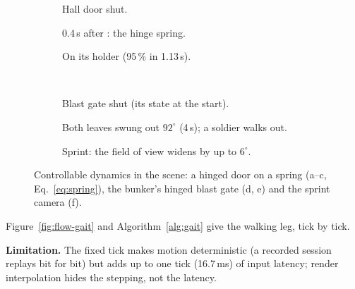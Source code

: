 \begin{figure}[htbp]
\centering
\begin{subfigure}[t]{0.325\linewidth}\caption{Hall door shut.}\end{subfigure}\hfill
\begin{subfigure}[t]{0.325\linewidth}\caption{0.4\,s after : the hinge spring.}\end{subfigure}\hfill
\begin{subfigure}[t]{0.325\linewidth}\caption{On its holder (95\,\% in 1.13\,s).}\end{subfigure}\\[1.2mm]
\begin{subfigure}[t]{0.325\linewidth}\caption{Blast gate shut (its state at the start).}\end{subfigure}\hfill
\begin{subfigure}[t]{0.325\linewidth}\caption{Both leaves swung out $92^\circ$ (4\,s); a soldier walks out.}\end{subfigure}\hfill
\begin{subfigure}[t]{0.325\linewidth}\caption{Sprint: the field of view widens by up to $6^\circ$.}\end{subfigure}
\caption{Controllable dynamics in the scene: a hinged door on a spring (a--c, Eq.~\eqref{eq:spring}), the bunker's
hinged blast gate (d, e) and the sprint camera (f).}
\label{fig:dyn}
\end{figure}

Figure~\ref{fig:flow-gait} and Algorithm~\ref{alg:gait} give the walking leg, tick by tick.
\flowGait
\algGait

\textbf{Limitation.} The fixed tick makes motion deterministic (a recorded session replays bit for bit) but adds up to one tick
(16.7\,ms) of input latency; render interpolation hides the stepping, not the latency.
